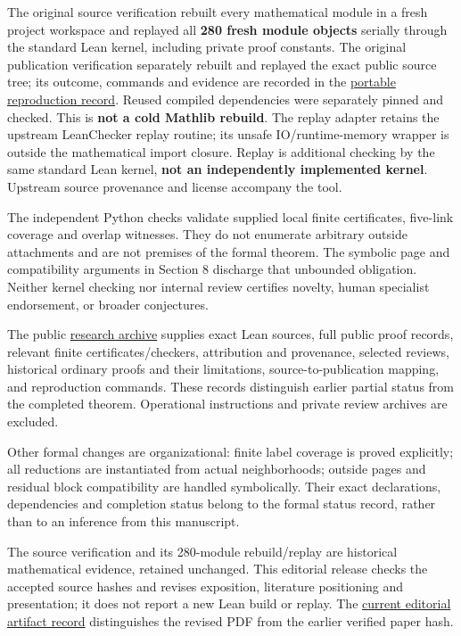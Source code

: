 \documentclass[11pt]{article}
\begin{document}
The original source verification rebuilt every mathematical module in a
fresh project workspace and replayed all \textbf{280 fresh module
objects} serially through the standard Lean kernel, including private
proof constants. The original publication verification separately
rebuilt and replayed the exact public source tree; its outcome, commands
and evidence are recorded in the
\href{https://github.com/pappa211/ai-math-experiments/blob/main/problems/TUZA-06/REPRODUCTION.md}{portable reproduction
record}. Reused compiled dependencies were separately pinned and
checked. This is \textbf{not a cold Mathlib rebuild}. The replay adapter
retains the upstream LeanChecker replay routine; its unsafe
IO/runtime-memory wrapper is outside the mathematical import closure.
Replay is additional checking by the same standard Lean kernel,
\textbf{not an independently implemented kernel}. Upstream source
provenance and license accompany the tool.

The independent Python checks validate supplied local finite
certificates, five-link coverage and overlap witnesses. They do not
enumerate arbitrary outside attachments and are not premises of the
formal theorem. The symbolic page and compatibility arguments in Section
8 discharge that unbounded obligation. Neither kernel checking nor
internal review certifies novelty, human specialist endorsement, or
broader conjectures.

The public \href{https://github.com/pappa211/ai-math-experiments/blob/main/problems/TUZA-06/README.md}{research archive}
supplies exact Lean sources, full public proof records, relevant finite
certificates/checkers, attribution and provenance, selected reviews,
historical ordinary proofs and their limitations, source-to-publication
mapping, and reproduction commands. These records distinguish earlier
partial status from the completed theorem. Operational instructions and
private review archives are excluded.

Other formal changes are organizational: finite label coverage is proved
explicitly; all reductions are instantiated from actual neighborhoods;
outside pages and residual block compatibility are handled symbolically.
Their exact declarations, dependencies and completion status belong to
the formal status record, rather than to an inference from this
manuscript.

The source verification and its 280-module rebuild/replay are historical
mathematical evidence, retained unchanged. This editorial release checks
the accepted source hashes and revises exposition, literature
positioning and presentation; it does not report a new Lean build or
replay. The
\href{https://github.com/pappa211/ai-math-experiments/blob/main/problems/TUZA-06/editorial/CURRENT_ARTIFACT.json}{current
editorial artifact record} distinguishes the revised PDF from the
earlier verified paper hash.
\end{document}
